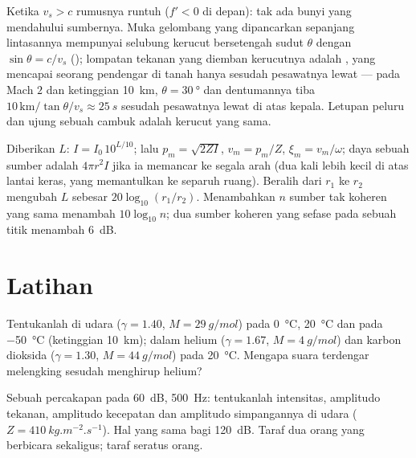 \begin{remark}[Supersonik]\label{rem:b2:sound-waves:mach}
Ketika $v_s > c$ rumusnya runtuh ($f' < 0$ di depan): tak ada bunyi yang mendahului
sumbernya. Muka gelombang yang dipancarkan sepanjang lintasannya mempunyai selubung
kerucut bersetengah sudut $\theta$ dengan $\sin\theta = c/v_s$ (\emph{});
lompatan tekanan yang diemban kerucutnya adalah , yang mencapai
seorang pendengar di tanah hanya sesudah pesawatnya lewat --- pada
Mach $2$ dan ketinggian \qty{10}{km}, $\theta = \qty{30}{\degree}$ dan dentumannya
tiba $10\,\text{km}/\tan\theta/v_s \approx \qty{25}{s}$ sesudah pesawatnya
lewat di atas kepala. Letupan peluru dan ujung sebuah cambuk adalah kerucut yang sama.
\end{remark}

\begin{method}\label{met:b2:sound-waves:method}
Diberikan  $L$: $I = I_0\,10^{L/10}$; lalu $p_m = \sqrt{2ZI}$,
$v_m = p_m/Z$, $\xi_m = v_m/\omega$; daya sebuah sumber adalah $4\pi r^2I$ jika ia
memancar ke segala arah (dua kali lebih kecil di atas lantai keras, yang
memantulkan ke separuh ruang). Beralih dari $r_1$ ke $r_2$ mengubah $L$ sebesar
$20\log_{10}(r_1/r_2)$. Menambahkan $n$ sumber tak koheren yang sama menambah
$10\log_{10}n$; dua sumber koheren yang sefase pada sebuah titik menambah \qty{6}{dB}.
\end{method}

\section{Latihan}

\begin{exercise}[$\star$]\label{exo:b2:sound-waves:1}
Tentukanlah  di udara ($\gamma = 1.40$, $M = \qty{29}{g/mol}$) pada
\qty{0}{\degreeCelsius}, \qty{20}{\degreeCelsius} dan pada \qty{-50}{\degreeCelsius}
(ketinggian \qty{10}{km}); dalam helium ($\gamma = 1.67$, $M = \qty{4}{g/mol}$) dan
karbon dioksida ($\gamma = 1.30$, $M = \qty{44}{g/mol}$) pada \qty{20}{\degreeCelsius}.
Mengapa suara terdengar melengking sesudah menghirup helium?
\end{exercise}

\begin{exercise}[$\star$]\label{exo:b2:sound-waves:2}
Sebuah percakapan pada \qty{60}{dB}, \qty{500}{Hz}: tentukanlah intensitas, amplitudo
tekanan, amplitudo kecepatan dan amplitudo simpangannya di udara
($Z = \qty{410}{kg.m^{-2}.s^{-1}}$). Hal yang sama bagi \qty{120}{dB}. Taraf dua
orang yang berbicara sekaligus; taraf seratus orang.
\end{exercise}


